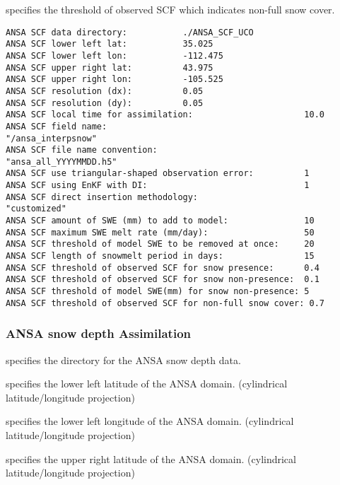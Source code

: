  specifies the threshold of observed SCF which indicates non-full
 snow cover.
 

 \begin{Verbatim}[frame=single]
ANSA SCF data directory:           ./ANSA_SCF_UCO
ANSA SCF lower left lat:           35.025
ANSA SCF lower left lon:           -112.475
ANSA SCF upper right lat:          43.975
ANSA SCF upper right lon:          -105.525
ANSA SCF resolution (dx):          0.05
ANSA SCF resolution (dy):          0.05
ANSA SCF local time for assimilation:                      10.0
ANSA SCF field name:                                       "/ansa_interpsnow"
ANSA SCF file name convention:                             "ansa_all_YYYYMMDD.h5"
ANSA SCF use triangular-shaped observation error:          1
ANSA SCF using EnKF with DI:                               1
ANSA SCF direct insertion methodology:                     "customized"
ANSA SCF amount of SWE (mm) to add to model:               10
ANSA SCF maximum SWE melt rate (mm/day):                   50
ANSA SCF threshold of model SWE to be removed at once:     20
ANSA SCF length of snowmelt period in days:                15
ANSA SCF threshold of observed SCF for snow presence:      0.4
ANSA SCF threshold of observed SCF for snow non-presence:  0.1
ANSA SCF threshold of model SWE(mm) for snow non-presence: 5
ANSA SCF threshold of observed SCF for non-full snow cover: 0.7
 \end{Verbatim}

 
 
 \subsubsection{ANSA snow depth Assimilation}
 \label{sssec:ansasnowdepthda}
 

 
  specifies the directory for the
 ANSA snow depth data.

  specifies the lower left latitude
 of the ANSA domain. (cylindrical latitude/longitude projection)

  specifies the lower left
 longitude of the ANSA domain. (cylindrical latitude/longitude
 projection)

  specifies the upper right
 latitude of the ANSA domain. (cylindrical latitude/longitude
 projection)

